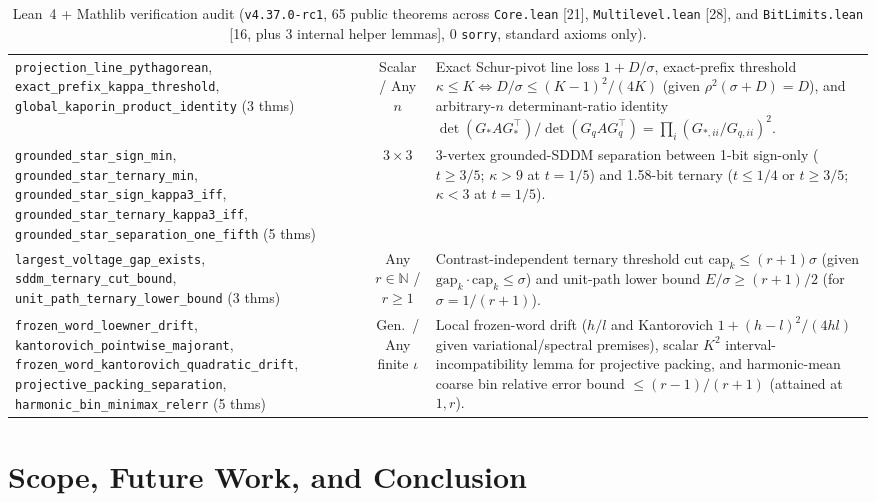 \documentclass[10pt]{article}
\begin{document}
\begin{table}[t]
\begin{tabular}{@{}p{}cp{}@{}}
\texttt{projection\_line\_pythagorean}, \texttt{exact\_prefix\_kappa\_threshold}, \texttt{global\_kaporin\_product\_identity} (3 thms) & Scalar / Any $n$ & Exact Schur-pivot line loss $1 + D/\sigma$, exact-prefix threshold $\kappa \le K \iff D/\sigma \le (K-1)^2/(4K)$ (given $\rho^2(\sigma+D)=D$), and arbitrary-$n$ determinant-ratio identity $\det(G_* A G_*^\top)/\det(G_q A G_q^\top) = \prod_i (G_{*,ii}/G_{q,ii})^2$. \\
\texttt{grounded\_star\_sign\_min}, \texttt{grounded\_star\_ternary\_min}, \texttt{grounded\_star\_sign\_kappa3\_iff}, \texttt{grounded\_star\_ternary\_kappa3\_iff}, \texttt{grounded\_star\_separation\_one\_fifth} (5 thms) & $3\times 3$ & 3-vertex grounded-SDDM separation between 1-bit sign-only ($t \ge 3/5$; $\kappa > 9$ at $t = 1/5$) and 1.58-bit ternary ($t \le 1/4$ or $t \ge 3/5$; $\kappa < 3$ at $t = 1/5$). \\
\texttt{largest\_voltage\_gap\_exists}, \texttt{sddm\_ternary\_cut\_bound}, \texttt{unit\_path\_ternary\_lower\_bound} (3 thms) & Any $r \in \mathbb{N}$ / $r \ge 1$ & Contrast-independent ternary threshold cut $\mathrm{cap}_k \le (r+1)\sigma$ (given $\mathrm{gap}_k \cdot \mathrm{cap}_k \le \sigma$) and unit-path lower bound $E/\sigma \ge (r+1)/2$ (for $\sigma = 1/(r+1)$). \\
\texttt{frozen\_word\_loewner\_drift}, \texttt{kantorovich\_pointwise\_majorant}, \texttt{frozen\_word\_kantorovich\_quadratic\_drift}, \texttt{projective\_packing\_separation}, \texttt{harmonic\_bin\_minimax\_relerr} (5 thms) & Gen.\ / Any finite $\iota$ & Local frozen-word drift ($h/l$ and Kantorovich $1+(h-l)^2/(4hl)$ given variational/spectral premises), scalar $K^2$ interval-incompatibility lemma for projective packing, and harmonic-mean coarse bin relative error bound $\le (r-1)/(r+1)$ (attained at $1, r$). \\
\bottomrule
\end{tabular}
\caption{Lean~4 + Mathlib verification audit (\texttt{v4.37.0-rc1}, 65 public theorems across \texttt{Core.lean} [21], \texttt{Multilevel.lean} [28], and \texttt{BitLimits.lean} [16, plus 3 internal helper lemmas], 0 \texttt{sorry}, standard axioms only).}
\label{tab:lean}
\end{table}

\section{Scope, Future Work, and Conclusion}\label{sec:conclusion}
\end{document}

